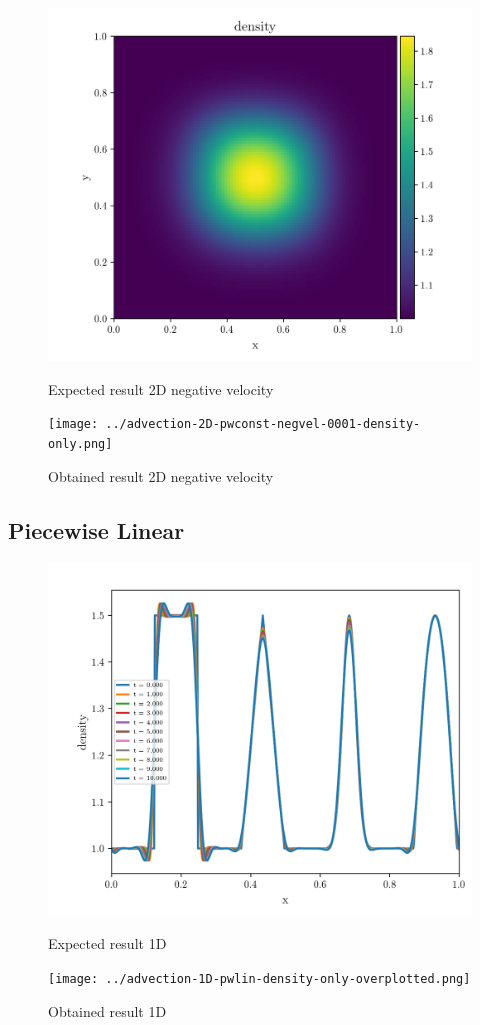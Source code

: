 \begin{figure}[htbp]
    \centering
	\includegraphics[width=.7\textwidth]{./figures/advection-2D-pwconst-negvel-0001-density-only.png}%
	\caption{Expected result 2D negative velocity}
	\texttt{[image: ../advection-2D-pwconst-negvel-0001-density-only.png]}%
	\caption{Obtained result 2D negative velocity}
\end{figure}





\clearpage
\subsection{Piecewise Linear}

\begin{figure}[htbp]
    \centering
	\includegraphics[width=.7\textwidth]{./figures/advection-1D-pwlin-density-only-overplotted.png}%
	\caption{Expected result 1D}
	\texttt{[image: ../advection-1D-pwlin-density-only-overplotted.png]}%
	\caption{Obtained result 1D}
\end{figure}

